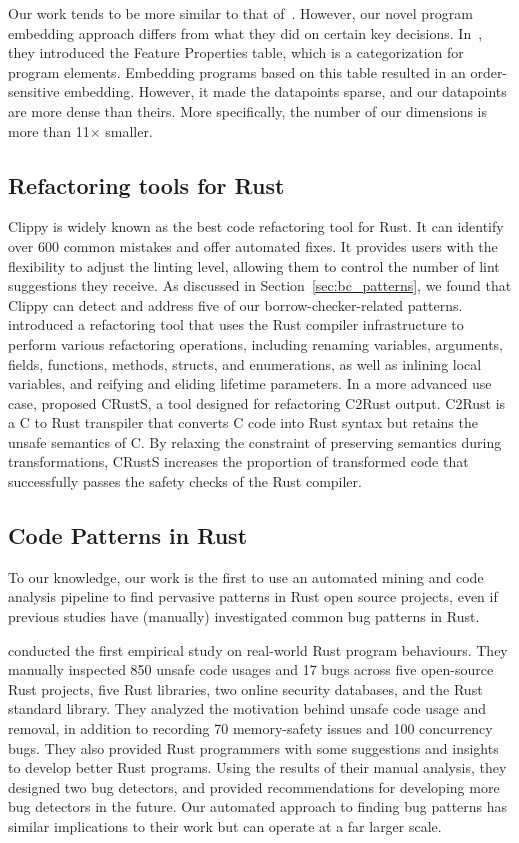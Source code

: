Our work tends to be more similar to that of~\cite{hanam2016discovering}. However, our novel program embedding approach differs from what they did on certain key decisions. In~\cite{hanam2016discovering}, they introduced the Feature Properties table, which is a categorization for program elements. Embedding programs based on this table resulted in an order-sensitive embedding. However, it made the datapoints sparse, and our datapoints are more dense than theirs. More specifically, the number of our dimensions is more than 11$\times$ smaller.

\subsection{Refactoring tools for Rust}
Clippy is widely known as the best code refactoring tool for Rust. It can identify over 600 common mistakes and offer automated fixes. It provides users with the flexibility to adjust the linting level, allowing them to control the number of lint suggestions they receive. As discussed in Section~\ref{sec:bc_patterns}, we found that Clippy can detect and address five of our borrow-checker-related patterns. \cite{sam2017automated} introduced a refactoring tool that uses the Rust compiler infrastructure to perform various refactoring operations, including renaming variables, arguments, fields, functions, methods, structs, and enumerations, as well as inlining local variables, and reifying and eliding lifetime parameters. In a more advanced use case, \cite{ling2022rust} proposed CRustS, a tool designed for refactoring C2Rust output. C2Rust is a C to Rust transpiler that converts C code into Rust syntax but retains the unsafe semantics of C. By relaxing the constraint of preserving semantics during transformations, CRustS increases the proportion of transformed code that successfully passes the safety checks of the Rust compiler.

\subsection{Code Patterns in Rust}

To our knowledge, our work is the first to use an automated mining and code analysis pipeline to find pervasive patterns in Rust open source projects, even if previous studies have (manually) investigated common bug patterns in Rust.

\cite{qin2020understanding} conducted the first empirical study on real-world Rust program behaviours. They manually inspected 850 unsafe code usages and 17 bugs across five open-source Rust projects, five Rust libraries, two online security databases, and the Rust standard library. They analyzed the motivation behind unsafe code usage and removal, in addition to recording 70 memory-safety issues and 100 concurrency bugs. They also provided Rust programmers with some suggestions and insights to develop better Rust programs. Using the results of their manual analysis, they designed two bug detectors, and provided recommendations for developing more bug detectors in the future. Our automated approach to finding bug patterns has similar implications to their work but can operate at a far larger scale.

